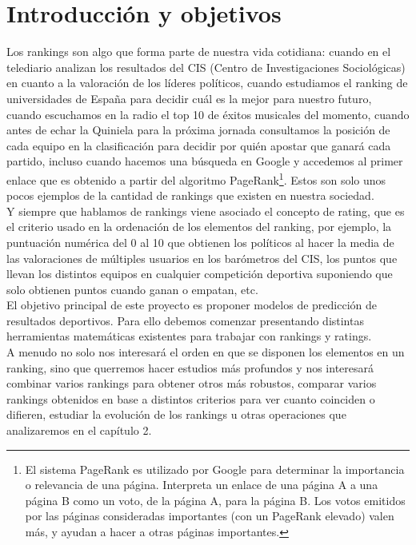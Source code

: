 \chapter{Introducción y objetivos}
Los rankings son algo que forma parte de nuestra vida cotidiana: cuando en el telediario analizan los resultados del CIS (Centro de Investigaciones Sociológicas) en cuanto a la valoración de los líderes políticos, cuando estudiamos el ranking de universidades de España para decidir cuál es la mejor para nuestro futuro, cuando escuchamos en la radio el top 10 de éxitos musicales del momento, cuando antes de echar la Quiniela para la próxima jornada consultamos la posición de cada equipo en la clasificación para decidir por quién apostar que ganará cada partido, incluso cuando hacemos una búsqueda en Google y accedemos al primer enlace que es obtenido a partir del algoritmo PageRank\footnote{El sistema PageRank es utilizado por Google para determinar la importancia o relevancia de una página. Interpreta un enlace de una página A a una página B como un voto, de la página A, para la página B. Los votos emitidos por las páginas consideradas importantes (con un PageRank elevado) valen más, y ayudan a hacer a otras páginas importantes.}. Estos son solo unos pocos ejemplos de la cantidad de rankings que existen en nuestra sociedad.\\

Y siempre que hablamos de rankings viene asociado el concepto de rating, que es el criterio usado en la ordenación de los elementos del ranking, por ejemplo, la puntuación numérica del 0 al 10 que obtienen los políticos al hacer la media de las valoraciones de múltiples usuarios en los barómetros del CIS, los puntos que llevan los distintos equipos en cualquier competición deportiva suponiendo que solo obtienen puntos cuando ganan o empatan, etc.\\

El objetivo principal de este proyecto es proponer modelos de predicción de resultados deportivos. Para ello debemos comenzar presentando distintas herramientas matemáticas existentes para trabajar con rankings y ratings.\\

A menudo no solo nos interesará el orden en que se disponen los elementos en un ranking, sino que querremos hacer estudios más profundos y nos interesará combinar varios rankings para obtener otros más robustos, comparar varios rankings obtenidos en base a distintos criterios para ver cuanto coinciden o difieren, estudiar la evolución de los rankings u otras operaciones que analizaremos en el capítulo 2.\\

